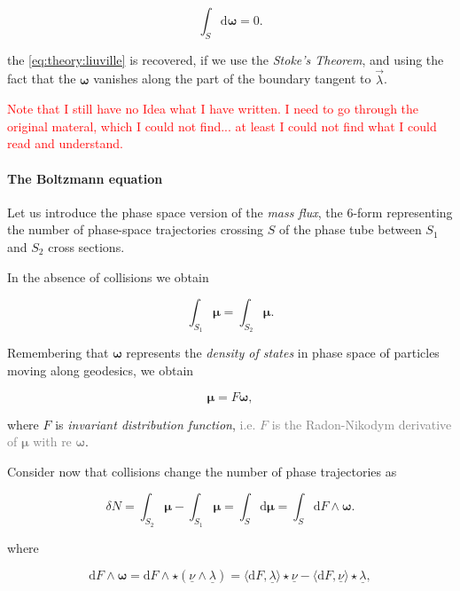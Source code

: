 \begin{equation}
\int_S\text{d}\boldsymbol{\omega} = 0.
\end{equation}

the \ref{eq:theory:liuville} is recovered, if we use the \textit{Stoke’s Theorem}, and using the fact that the $\boldsymbol{\omega}$ vanishes along the part of the boundary tangent to $\vec{\lambda}$.

\textcolor{red}{Note that I still have no Idea what I have written. I need to go through the original materal, which I could not find... at least I could not find what I could read and understand. }


\paragraph{The Boltzmann equation}


Let us introduce the phase space version of the \textit{mass flux}, the 6-form representing the number of phase-space trajectories crossing $S$ of the phase tube between $S_1$ and $S_2$ cross sections. 

In the absence of collisions we obtain 

\begin{equation}
\int_{S_1}\boldsymbol{\mu} = \int_{S_2}\boldsymbol{\mu}.
\end{equation}

Remembering that $\boldsymbol{\omega}$ represents the \textit{density of states} in phase space of particles moving along geodesics, we obtain 

\begin{equation}
\boldsymbol{\mu} = F\boldsymbol{\omega},
\end{equation}

where $F$ is \textit{invariant distribution function}, \textcolor{gray}{i.e. $F$ is the Radon-Nikodym derivative of $\boldsymbol{\mu}$ with re $\boldsymbol{\omega}$}.

Consider now that collisions change the number of phase trajectories as 

\begin{equation}
\delta N = \int_{S_2} \boldsymbol{\mu} - \int_{S_1}\boldsymbol{\mu} = \int_S \text{d}\boldsymbol{\mu} = \int_S \text{d}F\wedge\boldsymbol{\omega}.
\end{equation}

where 

\begin{equation}
\text{d}F\wedge\boldsymbol{\omega} = \text{d}F\wedge\star (\underline{\nu}\wedge\underline{\lambda}) = \langle\text{d}F,\underline{\lambda}\rangle\star\underline{\nu} - \langle\text{d}F,\underline{\nu}\rangle\star\underline{\lambda},
\end{equation}

